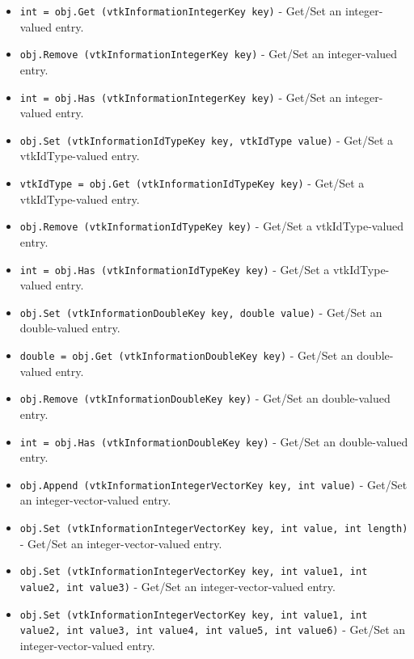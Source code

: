 \begin{itemize}
\item  \verb|int = obj.Get (vtkInformationIntegerKey key)| -  Get/Set an integer-valued entry.

\item  \verb|obj.Remove (vtkInformationIntegerKey key)| -  Get/Set an integer-valued entry.

\item  \verb|int = obj.Has (vtkInformationIntegerKey key)| -  Get/Set an integer-valued entry.

\item  \verb|obj.Set (vtkInformationIdTypeKey key, vtkIdType value)| -  Get/Set a vtkIdType-valued entry.

\item  \verb|vtkIdType = obj.Get (vtkInformationIdTypeKey key)| -  Get/Set a vtkIdType-valued entry.

\item  \verb|obj.Remove (vtkInformationIdTypeKey key)| -  Get/Set a vtkIdType-valued entry.

\item  \verb|int = obj.Has (vtkInformationIdTypeKey key)| -  Get/Set a vtkIdType-valued entry.

\item  \verb|obj.Set (vtkInformationDoubleKey key, double value)| -  Get/Set an double-valued entry.

\item  \verb|double = obj.Get (vtkInformationDoubleKey key)| -  Get/Set an double-valued entry.

\item  \verb|obj.Remove (vtkInformationDoubleKey key)| -  Get/Set an double-valued entry.

\item  \verb|int = obj.Has (vtkInformationDoubleKey key)| -  Get/Set an double-valued entry.

\item  \verb|obj.Append (vtkInformationIntegerVectorKey key, int value)| -  Get/Set an integer-vector-valued entry.

\item  \verb|obj.Set (vtkInformationIntegerVectorKey key, int value, int length)| -  Get/Set an integer-vector-valued entry.

\item  \verb|obj.Set (vtkInformationIntegerVectorKey key, int value1, int value2, int value3)| -  Get/Set an integer-vector-valued entry.

\item  \verb|obj.Set (vtkInformationIntegerVectorKey key, int value1, int value2, int value3, int value4, int value5, int value6)| -  Get/Set an integer-vector-valued entry.


\end{itemize}
